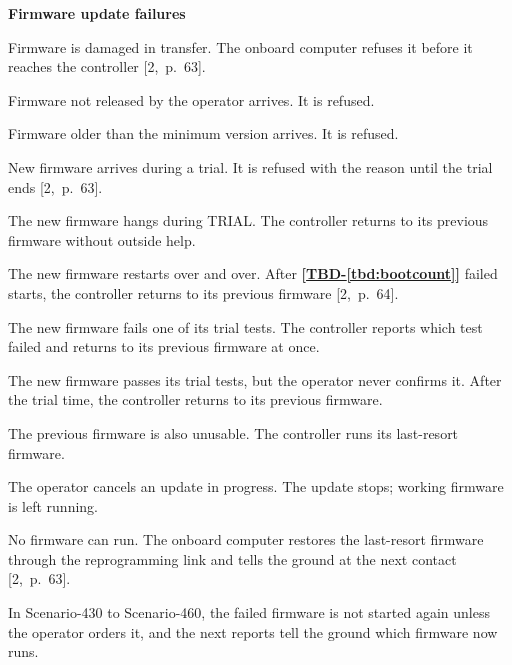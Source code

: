 \documentclass[11pt,a4paper]{article}
\newcommand{\tbd}[1]{\mbox{\textbf{[\hyperref[tbd:#1]{TBD-\ref*{tbd:#1}}]}}}
\begin{document}
\medskip
{}
\noindent\textbf{Firmware update failures}
\begin{description}[leftmargin=3cm]
\item[Scenario-400] Firmware is damaged in transfer. The onboard computer refuses
  it before it reaches the controller [2,~p.~63].
\item[Scenario-410] Firmware not released by the operator arrives. It is
  refused.
\item[Scenario-420] Firmware older than the minimum version arrives. It is
  refused.
\item[Scenario-425] New firmware arrives during a trial. It is refused with the
  reason until the trial ends [2,~p.~63].
\item[Scenario-430] The new firmware hangs during TRIAL. The controller returns
  to its previous firmware without outside help.
\item[Scenario-440] The new firmware restarts over and over. After
  \tbd{bootcount} failed starts, the controller returns to its previous
  firmware [2,~p.~64].
\item[Scenario-445] The new firmware fails one of its trial tests. The
  controller reports which test failed and returns to its previous firmware at
  once.
\item[Scenario-450] The new firmware passes its trial tests, but the operator
  never confirms it. After the trial time, the controller returns to its
  previous firmware.
\item[Scenario-460] The previous firmware is also unusable. The controller runs
  its last-resort firmware.
\item[Scenario-470] The operator cancels an update in progress. The update stops;
  working firmware is left running.
\item[Scenario-480] No firmware can run. The onboard computer restores the
  last-resort firmware through the reprogramming link and tells the ground at
  the next contact [2,~p.~63].
\end{description}
\noindent In Scenario-430 to Scenario-460, the failed firmware is not started
again unless the operator orders it, and the next reports tell the ground which
firmware now runs.
\end{document}

